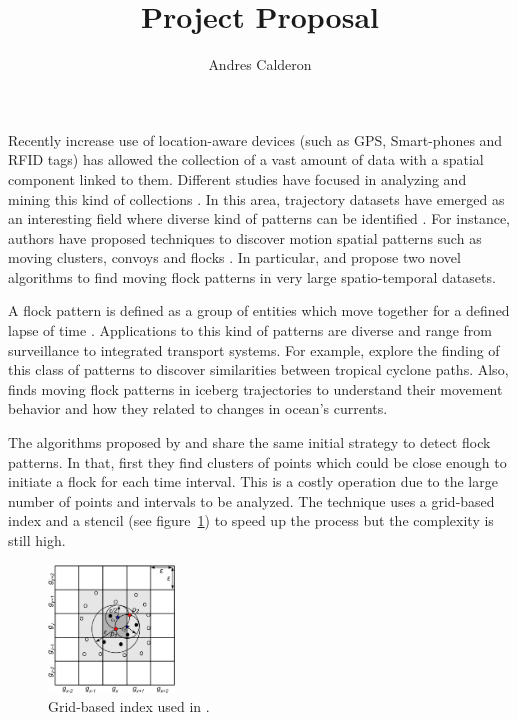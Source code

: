 \documentclass[a4paper, 12pt]{scrartcl}
\title{Project Proposal}
\author{Andres Calderon}
\begin{document}
\maketitle
 
Recently increase use of location-aware devices (such as GPS, Smart-phones and RFID tags) has allowed the collection of a vast amount of data with a spatial component linked to them.  Different studies have focused in analyzing and mining this kind of collections \citep{leung_knowledge_2010}\citep{Miller_2001}.  In this area, trajectory datasets have emerged as an interesting field where diverse kind of patterns can be identified \citep{zheng_computing_2011}\citep{vieira_spatio-temporal_2013}.  For instance, authors have proposed techniques to discover motion spatial patterns such as moving clusters\citep{kalnis_discovering_2005}, convoys\citep{jeung_discovery_2008} and flocks \citep{benkert_reporting_2006}\citep{gudmundsson_computing_2006}.  In particular, \citep{vieira_-line_2009} and \citep{turdukulov_visual_2014} propose two novel algorithms to find moving flock patterns in very large spatio-temporal datasets.  
 
A flock pattern is defined as a group of entities which move together for a defined lapse of time \citep{benkert_reporting_2006}.  Applications to this kind of patterns are diverse and range from surveillance to integrated transport systems.  For example, \citep{turdukulov_visual_2014} explore the finding of this class of patterns to discover similarities between tropical cyclone paths. Also, \citep{calderon_mining_2011} finds moving flock patterns in iceberg trajectories to understand their movement behavior and how they related to changes in ocean's currents. 
 
The algorithms proposed by \citep{vieira_-line_2009} and \citep{turdukulov_visual_2014} share the same initial strategy to detect flock patterns.  In that, first they find clusters of points which could be close enough to initiate a flock for each time interval.  This is a costly operation due to the large number of points and intervals to be analyzed.  The technique uses a grid-based index and a stencil (see figure~\ref{fig:grid}) to speed up the process but the complexity is still high.

\begin{figure}[t]
 \centering
 \includegraphics[width=0.3\textwidth]{./grid.png}
 \caption{Grid-based index used in \citep{vieira_-line_2009}.}
 \label{fig:grid}
\end{figure}
\end{document}

